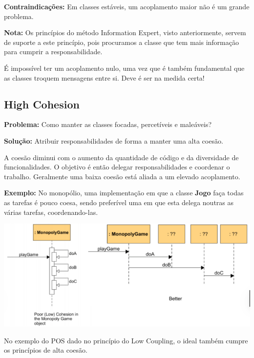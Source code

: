 \documentclass{article}
\begin{document}
\begin{flushleft}
    \textbf{Contraindicações:} Em classes estáveis, um acoplamento maior não é um grande problema.
\end{flushleft}

\begin{flushleft}
    \textbf{Nota:} Os princípios do método Information Expert, visto anteriormente, servem de suporte a este princípio, pois
    procuramos a classe que tem mais informação para cumprir a responsabilidade.
\end{flushleft}

É impossível ter um acoplamento nulo, uma vez que é também fundamental que as
classes troquem mensagens entre si. Deve é ser na medida certa!

\subsection{High Cohesion}

\begin{flushleft}
    \textbf{Problema:} Como manter as classes focadas, percetíveis e maleáveis?

    \vspace{3mm}
    \textbf{Solução:} Atribuir responsabilidades de forma a manter uma alta coesão.
\end{flushleft}

A coesão diminui com o aumento da quantidade de código e da diversidade de
funcionalidades. O objetivo é então delegar responsabilidades e coordenar o
trabalho.
Geralmente uma baixa coesão está aliada a um elevado acoplamento.

\begin{flushleft}
    \textbf{Exemplo:} No monopólio, uma implementação em que a classe \textbf{Jogo} faça todas as tarefas é pouco coesa, sendo
    preferível uma em que esta delega noutras as várias tarefas, coordenando-las.

    \begin{center}
        \includegraphics[scale=0.4]{Images/16.png}
    \end{center}

    No exemplo do POS dado no princípio do Low Coupling, o ideal também cumpre os princípios de alta
    coesão.
\end{flushleft}
\end{document}
